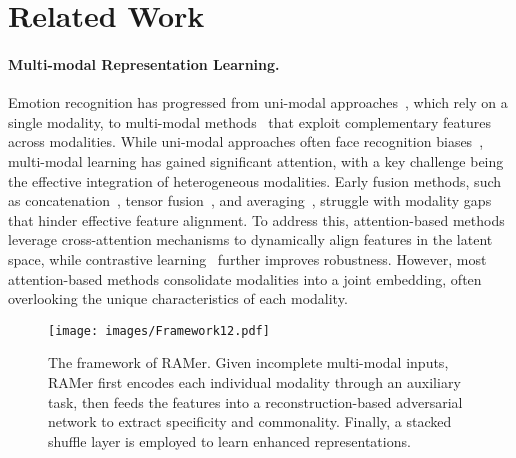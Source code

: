 \section{Related Work}

\paragraph{Multi-modal Representation Learning.}
Emotion recognition has progressed from uni-modal approaches~\cite{huang2021audio,saha2020towards}, which rely on a single modality, to multi-modal methods~\cite{mittal2020m3er,lv2021progressive,Tailor} that exploit complementary features across modalities. While uni-modal approaches often face recognition biases~\cite{huang2021audio}, multi-modal learning has gained significant attention, with a key challenge being the effective integration of heterogeneous modalities. Early fusion methods, such as concatenation~\cite{ngiam2011multimodal}, tensor fusion~\cite{liu2018efficient}, and averaging~\cite{fusenet}, struggle with modality gaps that hinder effective feature alignment. To address this, attention-based methods~\cite{adversarial_masking,cross_adaptation} leverage cross-attention mechanisms to dynamically align features in the latent space, while contrastive learning~\cite{chen2020simple_CL,CARAT} further improves robustness. However, most attention-based methods consolidate modalities into a joint embedding, often overlooking the unique characteristics of each modality.

\begin{figure*}[t] %
    \centering %
    \texttt{[image: images/Framework12.pdf]}
    \caption{The framework of RAMer. Given incomplete multi-modal inputs, RAMer first encodes each individual modality through an auxiliary task, then feeds the features into a reconstruction-based adversarial network to extract specificity and commonality. Finally, a stacked shuffle layer is employed to learn enhanced representations.}
    \label{framework}
    \vspace{-1.em}
\end{figure*}

